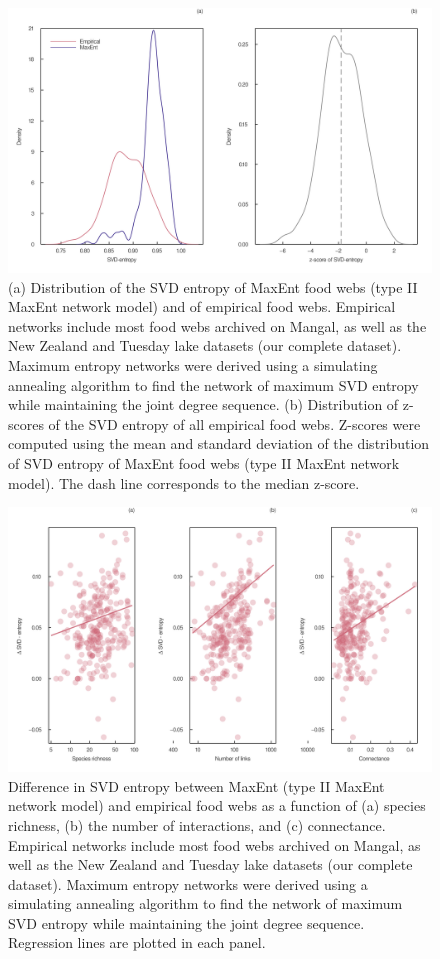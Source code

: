\documentclass[
  12pt,
]{article}
\begin{document}
\begin{figure}
\hypertarget{fig:entropy_dist}{%
\centering
\includegraphics{figures/entropy_distribution.png}
\caption{(a) Distribution of the SVD entropy of MaxEnt food webs (type
II MaxEnt network model) and of empirical food webs. Empirical networks
include most food webs archived on Mangal, as well as the New Zealand
and Tuesday lake datasets (our complete dataset). Maximum entropy
networks were derived using a simulating annealing algorithm to find the
network of maximum SVD entropy while maintaining the joint degree
sequence. (b) Distribution of z-scores of the SVD entropy of all
empirical food webs. Z-scores were computed using the mean and standard
deviation of the distribution of SVD entropy of MaxEnt food webs (type
II MaxEnt network model). The dash line corresponds to the median
z-score.}\label{fig:entropy_dist}
}
\end{figure}

\begin{figure}
\hypertarget{fig:entropy_size}{%
\centering
\includegraphics{figures/difference_entropy.png}
\caption{Difference in SVD entropy between MaxEnt (type II MaxEnt
network model) and empirical food webs as a function of (a) species
richness, (b) the number of interactions, and (c) connectance. Empirical
networks include most food webs archived on Mangal, as well as the New
Zealand and Tuesday lake datasets (our complete dataset). Maximum
entropy networks were derived using a simulating annealing algorithm to
find the network of maximum SVD entropy while maintaining the joint
degree sequence. Regression lines are plotted in each
panel.}\label{fig:entropy_size}
}
\end{figure}
\end{document}

